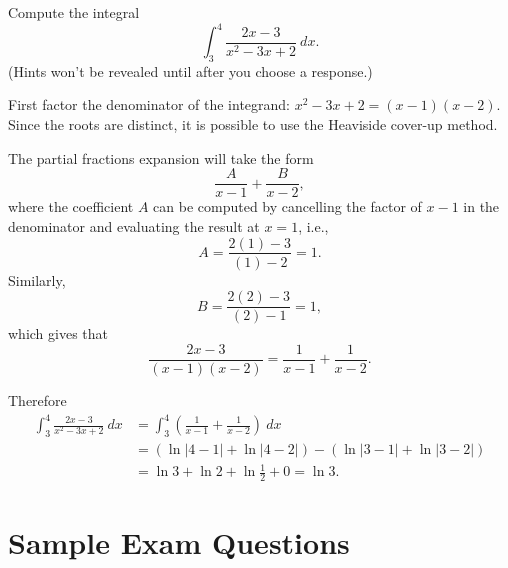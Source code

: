 \documentclass{ximera}
\begin{document}
\begin{question}%

Compute the integral
\[\int_{3}^{4}\frac{2x-3}{x^2-3x+2}~dx.\]
(Hints won't be revealed until after you choose a response.)
\begin{multiplechoice}
\end{multiplechoice}
\begin{feedback}
First factor the denominator of the integrand: \(x^2-3x+2 = (x-1)(x-2)\). Since the roots are distinct, it is possible to use the Heaviside cover-up method.  \begin{hint} The partial fractions expansion will take the form \[\frac{A}{x-1} + \frac{B}{x-2}, \] where the coefficient \(A\) can be computed by cancelling the factor of \(x-1\) in the denominator and evaluating the result at \(x = 1\), i.e., \[A = \frac{2(1)-3}{(1)-2} = 1. \] Similarly, \[B = \frac{2(2)-3}{(2)-1} = 1,\] which gives that \[\frac{2x-3}{(x-1)(x-2)} = \frac{1}{x-1} + \frac{1}{x-2}. \] \begin{hint} Therefore
\[ \begin{aligned} 
\int_{3}^{4}\frac{2x-3}{x^2-3x+2}~dx & = \int_{3}^{4}\left(\frac{1}{x-1} + \frac{1}{x-2}\right)~dx \\
 & = \left(\ln |4-1| + \ln |4-2| \right) - \left(\ln |3-1| + \ln |3-2| \right)\\
 & = \ln 3 + \ln 2 + \ln \frac{1}{2} + 0 = \ln 3.\end{aligned}\] \end{hint} \end{hint}
\end{feedback}

\end{question}

\section*{Sample Exam Questions}
\end{document}
